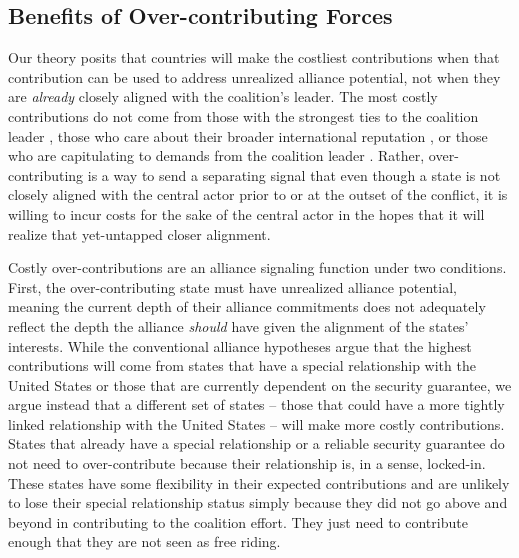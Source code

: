 \documentclass[12pt,letterpaper]{article}
\begin{document}
	\subsection{Benefits of Over-contributing Forces}
		Our theory posits that countries will make the costliest contributions when that contribution can be used to address unrealized alliance potential, not when they are \textit{already} closely aligned with the coalition's leader. The most costly contributions do not come from those with the strongest ties to the coalition leader \citep{ringsmose_natoburdensharingredux_2010, wolford_showingrestraintsignaling_2014}, those who care about their broader international reputation \citep{pedersen_bandwagonstatuschanging_2018}, or those who are capitulating to demands from the coalition leader \citep{schweller_newrealistresearch_1997}. Rather, over-contributing is a way to send a separating signal that even though a state is not closely aligned with the central actor prior to or at the outset of the conflict, it is willing to incur costs for the sake of the central actor in the hopes that it will realize that yet-untapped closer alignment.

		Costly over-contributions are an alliance signaling function under two conditions. First, the over-contributing state must have unrealized alliance potential, meaning the current depth of their alliance commitments does not adequately reflect the depth the alliance \textit{should} have given the alignment of the states' interests. While the conventional alliance hypotheses argue that the highest contributions will come from states that have a special relationship with the United States or those that are currently dependent on the security guarantee, we argue instead that a different set of states -- those that could have a more tightly linked relationship with the United States -- will make more costly contributions. States that already have a special relationship or a reliable security guarantee do not need to over-contribute because their relationship is, in a sense, locked-in. These states have some flexibility in their expected contributions and are unlikely to lose their special relationship status simply because they did not go above and beyond in contributing to the coalition effort. They just need to contribute enough that they are not seen as free riding. 
\end{document}
